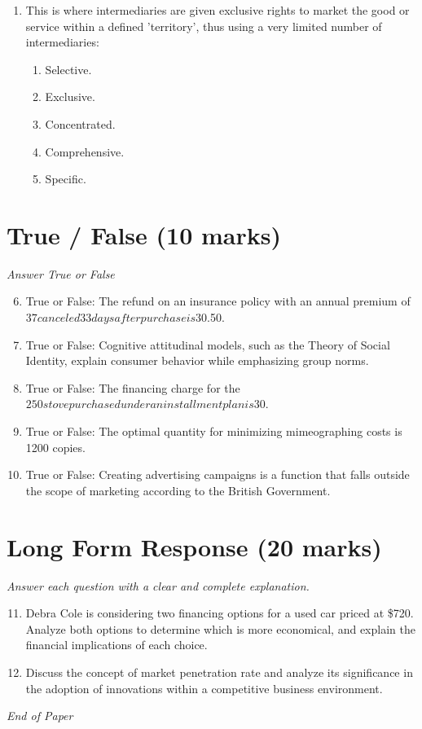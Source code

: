 \documentclass[12pt]{article}
\begin{document}
\begin{enumerate}[label=\arabic*.]
\begin{enumerate}[label=(\alph*)]
    \item \$790.92
    \item \$798
    \item \$810
    \item \$799.92
    \item \$785.92
\end{enumerate}
\item This is where intermediaries are given exclusive rights to market the good or service within a defined 'territory', thus using a very limited number of intermediaries:
\begin{enumerate}[label=(\alph*)]
    \item Selective.
    \item Exclusive.
    \item Concentrated.
    \item Comprehensive.
    \item Specific.
\end{enumerate}
\end{enumerate}

\section*{True / False (10 marks)}
\textit{Answer True or False}
\begin{enumerate}[label=\arabic*.]
\setcounter{enumi}{5}
\item True or False: The refund on an insurance policy with an annual premium of $37 canceled 33 days after purchase is $30.50.
\item True or False: Cognitive attitudinal models, such as the Theory of Social Identity, explain consumer behavior while emphasizing group norms.
\item True or False: The financing charge for the $250 stove purchased under an installment plan is $30.
\item True or False: The optimal quantity for minimizing mimeographing costs is 1200 copies.
\item True or False: Creating advertising campaigns is a function that falls outside the scope of marketing according to the British Government.
\end{enumerate}

\section*{Long Form Response (20 marks)}
\textit{Answer each question with a clear and complete explanation.}
\begin{enumerate}[label=\arabic*.]
\setcounter{enumi}{10}
\item Debra Cole is considering two financing options for a used car priced at \$720. Analyze both options to determine which is more economical, and explain the financial implications of each choice.
\item Discuss the concept of market penetration rate and analyze its significance in the adoption of innovations within a competitive business environment.
\end{enumerate}

\vfill
\noindent\textit{End of Paper}
\end{document}
